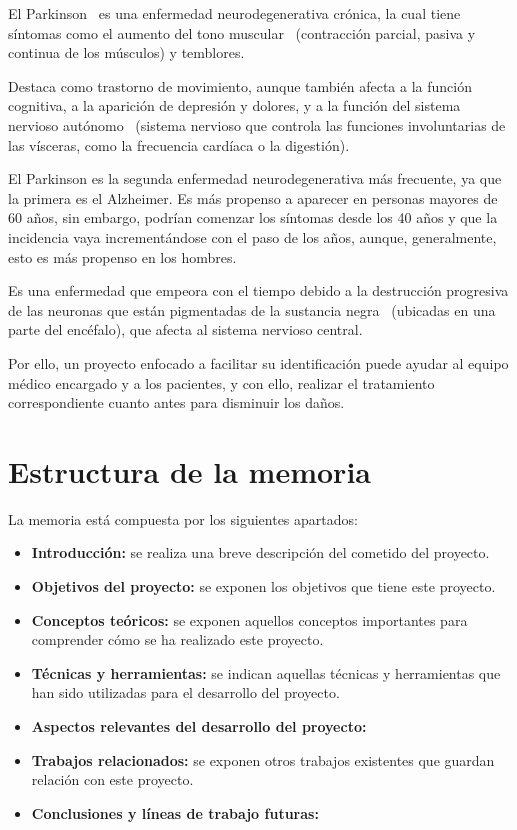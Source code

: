 El Parkinson~\cite{parkinson} es una enfermedad neurodegenerativa crónica, la cual tiene síntomas como el aumento del tono muscular~\cite{tonomuscular} (contracción parcial, pasiva y continua de los músculos) y temblores.

Destaca como trastorno de movimiento, aunque también afecta a la función cognitiva, a la aparición de depresión y dolores, y a la función del sistema nervioso autónomo~\cite{sistnervautonomo} (sistema nervioso que controla las funciones involuntarias de las vísceras, como la frecuencia cardíaca o la digestión).

El Parkinson es la segunda enfermedad neurodegenerativa más frecuente, ya que la primera es el Alzheimer. Es más propenso a aparecer en personas mayores de 60 años, sin embargo, podrían comenzar los síntomas desde los 40 años y que la incidencia vaya incrementándose con el paso de los años, aunque, generalmente, esto es más propenso en los hombres.

Es una enfermedad que empeora con el tiempo debido a la destrucción progresiva de las neuronas que están pigmentadas de la sustancia negra~\cite{sustancianegra} (ubicadas en una parte del encéfalo), que afecta al sistema nervioso central.

Por ello, un proyecto enfocado a facilitar su identificación puede ayudar al equipo médico encargado y a los pacientes, y con ello, realizar el tratamiento correspondiente cuanto antes para disminuir los daños.

\section{Estructura de la memoria}
La memoria está compuesta por los siguientes apartados:
\begin{itemize}
	\item \textbf{Introducción:} se realiza una breve descripción del cometido del proyecto.
	\item \textbf{Objetivos del proyecto:} se exponen los objetivos que tiene este proyecto.
	\item \textbf{Conceptos teóricos:} se exponen aquellos conceptos importantes para comprender cómo se ha realizado este proyecto.
	\item \textbf{Técnicas y herramientas:} se indican aquellas técnicas y herramientas que han sido utilizadas para el desarrollo del proyecto.
	\item \textbf{Aspectos relevantes del desarrollo del proyecto:}
	\item \textbf{Trabajos relacionados:} se exponen otros trabajos existentes que guardan relación con este proyecto.
	\item \textbf{Conclusiones y líneas de trabajo futuras:}
\end{itemize}

